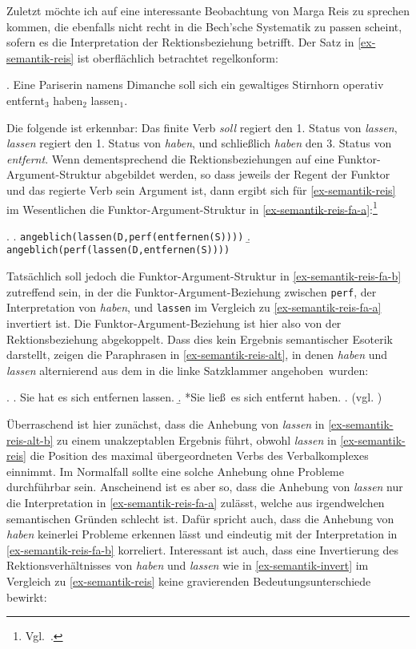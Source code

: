 Zuletzt möchte ich auf eine interessante Beobachtung von Marga Reis \citep{Reis:79} zu sprechen kommen, die ebenfalls nicht recht in die Bech'sche Systematik zu passen scheint, sofern es die Interpretation der Rektionsbeziehung betrifft. Der Satz in \ref{ex-semantik-reis} ist oberflächlich betrachtet regelkonform:
{
\ex. \label{ex-semantik-reis} Eine Pariserin namens Dimanche soll sich ein gewaltiges Stirnhorn operativ entfernt$_3$ haben$_2$ lassen$_1$. \hfill \citep[15]{Reis:79}

}
\noindent Die folgende  ist erkennbar: Das finite Verb {\it soll} regiert den 1. Status von {\it lassen}, {\it lassen} regiert den 1. Status von {\it haben}, und schlie\ss lich {\it haben} den 3. Status von {\it entfernt}. Wenn dementsprechend die Rektionsbeziehungen auf eine Funktor-Argument-Struktur abgebildet werden, so dass jeweils der Regent der Funktor und das regierte Verb sein Argument ist, dann ergibt sich für \ref{ex-semantik-reis} im Wesentlichen die Funktor-Argument-Struktur in \ref{ex-semantik-reis-fa-a}:\footnote{Vgl.\ \citet[(159)]{Meurers:99}.}

\ex. 
\a. {\tt angeblich(lassen(D,perf(entfernen(S))))} \label{ex-semantik-reis-fa-a}
\b. {\tt angeblich(perf(lassen(D,entfernen(S))))} \label{ex-semantik-reis-fa-b}   

Tatsächlich soll jedoch die Funktor-Argument-Struktur in \ref{ex-semantik-reis-fa-b} zutreffend sein, in der die Funktor-Argument-Beziehung zwischen {\tt perf}, der Interpretation von {\it haben}, und {\tt lassen} im Vergleich zu \ref{ex-semantik-reis-fa-a} invertiert ist. Die Funktor-Argument-Beziehung ist hier also von der Rektionsbeziehung abgekoppelt. Dass dies kein Ergebnis semantischer Esoterik darstellt, zeigen die Paraphrasen in \ref{ex-semantik-reis-alt}, in denen {\it haben} und {\it lassen} alternierend aus dem  in die linke Satzklammer \glq angehoben\grq\ wurden: 
  
\ex. \label{ex-semantik-reis-alt}
\a. Sie hat es sich entfernen lassen. \label{ex-semantik-reis-alt-a}
\b. *Sie lie\ss \ es sich entfernt haben. \label{ex-semantik-reis-alt-b}
\z. (vgl. \citealt[(160)]{Meurers:99})

Überraschend ist hier zunächst, dass die Anhebung von {\it lassen} in \ref{ex-semantik-reis-alt-b} zu einem unakzeptablen Ergebnis führt, obwohl {\it lassen} in \ref{ex-semantik-reis} die Position des maximal übergeordneten Verbs des Verbalkomplexes einnimmt. Im Normalfall sollte eine solche Anhebung ohne Probleme durchführbar sein. Anscheinend ist es aber so, dass die Anhebung von {\it lassen} nur die Interpretation in \ref{ex-semantik-reis-fa-a} zulässt, welche aus irgendwelchen semantischen Gründen schlecht ist. Dafür spricht auch, dass die Anhebung von {\it haben} keinerlei Probleme erkennen lässt und eindeutig mit der Interpretation in \ref{ex-semantik-reis-fa-b} korreliert. Interessant ist auch, dass eine Invertierung des Rektionsverhältnisses von {\it haben} und {\it lassen} wie in \ref{ex-semantik-invert} im Vergleich zu \ref{ex-semantik-reis} keine gravierenden Bedeutungsunterschiede bewirkt:   

